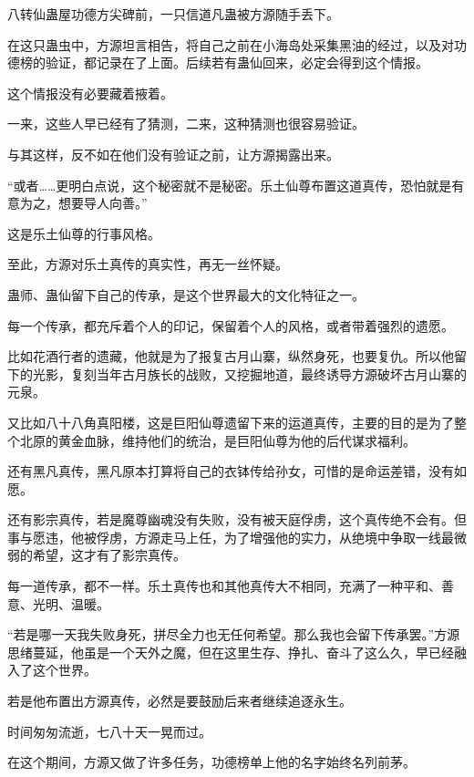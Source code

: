 
\begin{this_body}



八转仙蛊屋功德方尖碑前，一只信道凡蛊被方源随手丢下。

在这只蛊虫中，方源坦言相告，将自己之前在小海岛处采集黑油的经过，以及对功德榜的验证，都记录在了上面。后续若有蛊仙回来，必定会得到这个情报。

这个情报没有必要藏着掖着。

一来，这些人早已经有了猜测，二来，这种猜测也很容易验证。

与其这样，反不如在他们没有验证之前，让方源揭露出来。

“或者……更明白点说，这个秘密就不是秘密。乐土仙尊布置这道真传，恐怕就是有意为之，想要导人向善。”

这是乐土仙尊的行事风格。

至此，方源对乐土真传的真实性，再无一丝怀疑。

蛊师、蛊仙留下自己的传承，是这个世界最大的文化特征之一。

每一个传承，都充斥着个人的印记，保留着个人的风格，或者带着强烈的遗愿。

比如花酒行者的遗藏，他就是为了报复古月山寨，纵然身死，也要复仇。所以他留下的光影，复刻当年古月族长的战败，又挖掘地道，最终诱导方源破坏古月山寨的元泉。

又比如八十八角真阳楼，这是巨阳仙尊遗留下来的运道真传，主要的目的是为了整个北原的黄金血脉，维持他们的统治，是巨阳仙尊为他的后代谋求福利。

还有黑凡真传，黑凡原本打算将自己的衣钵传给孙女，可惜的是命运差错，没有如愿。

还有影宗真传，若是魔尊幽魂没有失败，没有被天庭俘虏，这个真传绝不会有。但事与愿违，他被俘虏，方源走马上任，为了增强他的实力，从绝境中争取一线最微弱的希望，这才有了影宗真传。

每一道传承，都不一样。乐土真传也和其他真传大不相同，充满了一种平和、善意、光明、温暖。

“若是哪一天我失败身死，拼尽全力也无任何希望。那么我也会留下传承罢。”方源思绪蔓延，他虽是一个天外之魔，但在这里生存、挣扎、奋斗了这么久，早已经融入了这个世界。

若是他布置出方源真传，必然是要鼓励后来者继续追逐永生。

时间匆匆流逝，七八十天一晃而过。

在这个期间，方源又做了许多任务，功德榜单上他的名字始终名列前茅。


\end{this_body}
